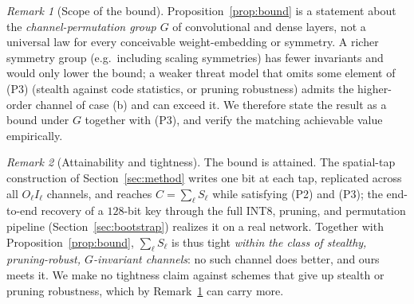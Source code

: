 \documentclass[a4paper,fleqn]{cas-dc}
\theoremstyle{plain}
\theoremstyle{remark}
\newtheorem{remark}{Remark}
\begin{document}
\begin{remark}[Scope of the bound]\label{rem:scope}
Proposition~\ref{prop:bound} is a statement about the \emph{channel-permutation group $G$} of
convolutional and dense layers, not a universal law for every conceivable weight-embedding or
symmetry. A richer symmetry group (e.g.\ including scaling symmetries) has fewer invariants and
would only lower the bound; a weaker threat model that omits some element of \textup{(P3)}
(stealth against code statistics, or pruning robustness) admits the higher-order channel of
case (b) and can exceed it. We therefore state the result as a bound under $G$ together with
\textup{(P3)}, and verify the matching achievable value empirically.
\end{remark}

\begin{remark}[Attainability and tightness]\label{rem:tight}
The bound is attained. The spatial-tap construction of Section~\ref{sec:method} writes one
bit at each tap, replicated across all $O_\ell I_\ell$ channels, and reaches
$C=\sum_\ell S_\ell$ while satisfying \textup{(P2)} and \textup{(P3)}; the end-to-end
recovery of a $128$-bit key through the full INT8, pruning, and permutation pipeline
(Section~\ref{sec:bootstrap}) realizes it on a real network. Together with
Proposition~\ref{prop:bound}, $\sum_\ell S_\ell$ is thus tight \emph{within the class of
stealthy, pruning-robust, $G$-invariant channels}: no such channel does better, and ours
meets it. We make no tightness claim against schemes that give up stealth or pruning
robustness, which by Remark~\ref{rem:scope} can carry more.
\end{remark}
\end{document}
